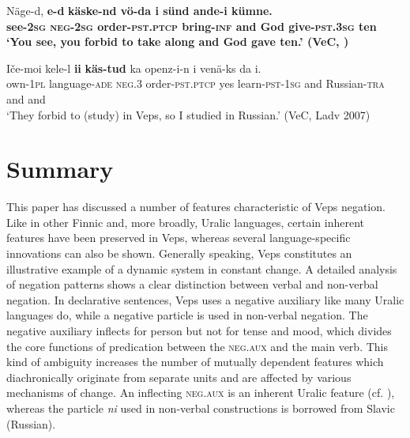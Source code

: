 \documentclass[output=paper,colorlinks=true, citecolor=brown]{langscibook}
\begin{document}
\ea\label{ex:vep:96} 
    \gll  Näge-d, \textbf{e{}-d} \bfseries{käske{}-nd}  vö{}-da i sünd ande{}-i kümne. \\ 
          see-\textsc{2sg} \textsc{neg-2sg} order-\textsc{pst.ptcp} bring\textsc{{}-inf} and God give-\textsc{pst}.\textsc{3sg} ten\\
    \glt ‘You see, you forbid to take along and God gave ten.’ (VeC, \citealt[108]{MSFOu70})
\z

\ea
    \label{ex:vep:97}
    \gll Iče-moi  kele-l \textbf{ii} \textbf{käs-tud}  ka openz-i-n i venä-ks da i.\\
         own-1\textsc{pl}  language-\textsc{ade} \textsc{neg.3} order-\textsc{pst.ptcp} yes learn-\textsc{pst}{}-\textsc{1sg} and Russian-\textsc{tra} and and\\%
    \glt ‘They forbid to (study) in Veps, so I studied in Russian.’ (VeC, Ladv 2007)
\z

\section{Summary}\label{sec:vep:5}

This paper has discussed a number of features characteristic of Veps negation. Like in other Finnic and, more broadly, Uralic languages, certain inherent features have been preserved in Veps, whereas several language-specific innovations can also be shown. Generally speaking, Veps constitutes an illustrative example of a dynamic system in constant change. A detailed analysis of negation patterns shows a clear distinction between verbal and non-verbal negation. In declarative sentences, Veps uses a negative auxiliary like many Uralic languages do, while a negative particle is used in non-verbal negation. The negative auxiliary inflects for person but not for tense and mood, which divides the core functions of predication between the \textsc{neg}.\textsc{aux} and the main verb. This kind of ambiguity increases the number of mutually dependent features which diachronically originate from separate units and are affected by various mechanisms of change.
An inflecting \textsc{neg}.\textsc{aux} is an inherent Uralic feature (cf. \citealt{MiestamoEtAl2015}), whereas the particle \textit{ni} used in non-verbal constructions is borrowed from Slavic (Russian).
\end{document}
